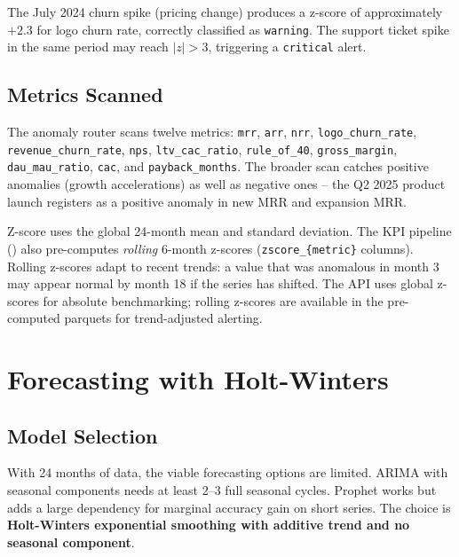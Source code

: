 The July 2024 churn spike (pricing change) produces a z-score of approximately $+2.3$ for logo churn rate, correctly classified as \texttt{warning}. The support ticket spike in the same period may reach $|z| > 3$, triggering a \texttt{critical} alert.

\subsection{Metrics Scanned}

The anomaly router scans twelve metrics: \texttt{mrr}, \texttt{arr}, \texttt{nrr}, \texttt{logo\_churn\_rate}, \texttt{revenue\_churn\_rate}, \texttt{nps}, \texttt{ltv\_cac\_ratio}, \texttt{rule\_of\_40}, \texttt{gross\_margin}, \texttt{dau\_mau\_ratio}, \texttt{cac}, and \texttt{payback\_months}. The broader scan catches positive anomalies (growth accelerations) as well as negative ones -- the Q2 2025 product launch registers as a positive anomaly in new MRR and expansion MRR.

\begin{keyinsight}
Z-score uses the global 24-month mean and standard deviation. The KPI pipeline () also pre-computes \textit{rolling} 6-month z-scores (\texttt{zscore\_\{metric\}} columns). Rolling z-scores adapt to recent trends: a value that was anomalous in month 3 may appear normal by month 18 if the series has shifted. The API uses global z-scores for absolute benchmarking; rolling z-scores are available in the pre-computed parquets for trend-adjusted alerting.
\end{keyinsight}

\section{Forecasting with Holt-Winters}
\label{sec:kpi-forecast}


\subsection{Model Selection}

With 24 months of data, the viable forecasting options are limited. ARIMA with seasonal components needs at least 2--3 full seasonal cycles. Prophet works but adds a large dependency for marginal accuracy gain on short series. The choice is \textbf{Holt-Winters exponential smoothing with additive trend and no seasonal component}.

